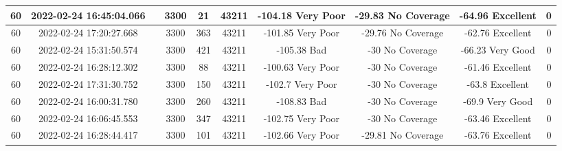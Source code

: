 \begin{longtable*}{|c|c|c|c|c|c|c|c|c|c|}
60&2022-02-24 16:45:04.066&&3300&21&43211& -104.18   Very Poor   & -29.83    No Coverage & -64.96    Excellent   & 0\\\hline
{}60&2022-02-24 17:20:27.668&&3300&363&43211& -101.85   Very Poor   & -29.76    No Coverage & -62.76    Excellent   & 0\\\hline
{}60&2022-02-24 15:31:50.574&&3300&421&43211& -105.38   Bad         & -30       No Coverage & -66.23    Very Good   & 0\\\hline
{}60&2022-02-24 16:28:12.302&&3300&88&43211& -100.63   Very Poor   & -30       No Coverage & -61.46    Excellent   & 0\\\hline
{}60&2022-02-24 17:31:30.752&&3300&150&43211& -102.7    Very Poor   & -30       No Coverage & -63.8     Excellent   & 0\\\hline
{}60&2022-02-24 16:00:31.780&&3300&260&43211& -108.83   Bad         & -30       No Coverage & -69.9     Very Good   & 0\\\hline
{}60&2022-02-24 16:06:45.553&&3300&347&43211& -102.75   Very Poor   & -30       No Coverage & -63.46    Excellent   & 0\\\hline
{}60&2022-02-24 16:28:44.417&&3300&101&43211& -102.66   Very Poor   & -29.81    No Coverage & -63.76    Excellent   & 0\\\hline

\end{longtable*}
